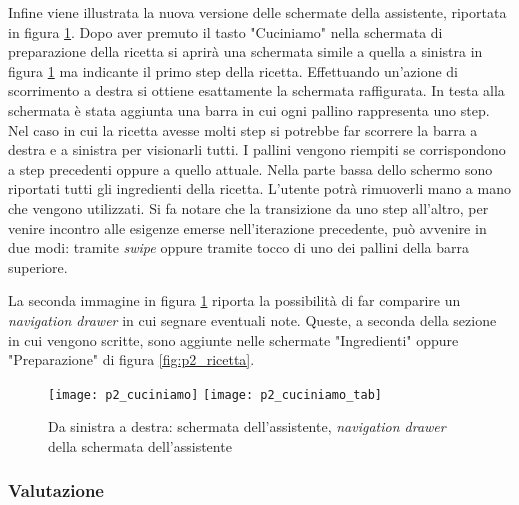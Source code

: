 Infine viene illustrata la nuova versione delle schermate della assistente, riportata in figura \ref{fig:p2_cuciniamo}.
Dopo aver premuto il tasto "Cuciniamo" nella schermata di preparazione della ricetta si aprirà una schermata simile a quella a sinistra in figura \ref{fig:p2_cuciniamo} ma indicante il primo step della ricetta.
Effettuando un'azione di scorrimento a destra si ottiene esattamente la schermata raffigurata.
In testa alla schermata è stata aggiunta una barra in cui ogni pallino rappresenta uno step.
Nel caso in cui la ricetta avesse molti step si potrebbe far scorrere la barra a destra e a sinistra per visionarli tutti.
I pallini vengono riempiti se corrispondono a step precedenti oppure a quello attuale.
Nella parte bassa dello schermo sono riportati tutti gli ingredienti della ricetta.
L'utente potrà rimuoverli mano a mano che vengono utilizzati.
Si fa notare che la transizione da uno step all'altro, per venire incontro alle esigenze emerse nell'iterazione precedente, può avvenire in due modi: tramite \textit{swipe} oppure tramite tocco di uno dei pallini della barra superiore.

La seconda immagine in figura \ref{fig:p2_cuciniamo} riporta la possibilità di far comparire un \textit{navigation drawer} in cui segnare eventuali note.
Queste, a seconda della sezione in cui vengono scritte, sono aggiunte nelle schermate "Ingredienti" oppure "Preparazione" di figura \ref{fig:p2_ricetta}.

\begin{figure}[ht]
  \begin{center}
    \texttt{[image: p2\_cuciniamo]}
    \texttt{[image: p2\_cuciniamo\_tab]}
    \caption{Da sinistra a destra: schermata dell'assistente, \textit{navigation drawer} della schermata dell'assistente}
    \label{fig:p2_cuciniamo}
  \end{center}
\end{figure}

\clearpage
\subsubsection{Valutazione}

